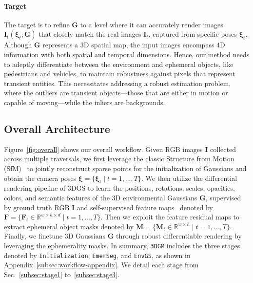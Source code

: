 \paragraph{Target} The target is to refine $\mathbf{G}$ to a level where it can accurately render images $\mathbf{I}_t(\boldsymbol{\xi}_t;\mathbf{G})$ that closely match the real images $\mathbf{I}_t$, captured from specific poses $\boldsymbol{\xi}_t$. Although $\mathbf{G}$ represents a 3D spatial map, the input images encompass 4D information with both spatial and temporal dimensions. Hence, our method needs to adeptly differentiate between the environment and ephemeral objects, like pedestrians and vehicles, to maintain robustness against pixels that represent transient entities. This necessitates addressing a robust estimation problem, where the outliers are transient objects—those that are either in motion or capable of moving—while the inliers are backgrounds.

\subsection{Overall Architecture}
Figure~\ref{fig:overall} shows our overall workflow. Given RGB images $\mathbf{I}$ collected across multiple traversals, we first leverage the classic Structure from Motion (SfM)~\cite{schonberger2016structure} to jointly reconstruct sparse points for the initialization of Gaussians and obtain the camera poses $\boldsymbol{\xi} = \{\boldsymbol{\xi}_t \mid t = 1, \ldots, T\}$. We then utilize the differential rendering pipeline of 3DGS to learn the positions, rotations, scales, opacities, colors, and semantic features of the 3D environmental Gaussians $\mathbf{G}$, supervised by ground truth RGB $\mathbf{I}$ and self-supervised feature maps~\cite{oquab2023dinov2} denoted by $\mathbf{F}=\{\mathbf{F}_t \in \mathbb{R}^{w\times h\times d} \mid t = 1, \ldots, T\}$. Then we exploit the feature residual maps to extract ephemeral object masks denoted by $\mathbf{M}=\{\mathbf{M}_t \in \mathbb{R}^{w\times h} \mid t = 1, \ldots, T\}$. Finally, we finetune 3D Gaussians $\mathbf{G}$ through robust differentiable rendering by leveraging the ephemerality masks. In summary, \texttt{3DGM} includes the three stages denoted by \texttt{Initialization}, \texttt{EmerSeg}, and \texttt{EnvGS}, as shown in Appendix~\ref{subsec:workflow-appendix}. We  detail each stage from Sec.~\ref{subsec:stage1} to~\ref{subsec:stage3}.

